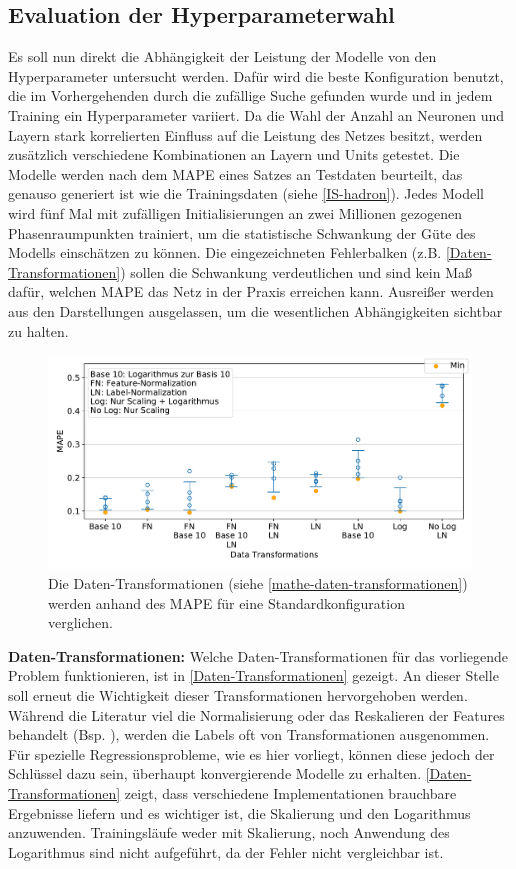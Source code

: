 \subsection{Evaluation der Hyperparameterwahl}
\label{Vergleich}
Es soll nun direkt die Abhängigkeit der Leistung der Modelle von den Hyperparameter untersucht werden. Dafür wird die beste Konfiguration benutzt, die im Vorhergehenden durch die zufällige Suche gefunden wurde und in jedem Training ein Hyperparameter variiert. Da die Wahl der Anzahl an Neuronen und Layern stark korrelierten Einfluss auf die Leistung des Netzes besitzt, werden zusätzlich verschiedene Kombinationen an Layern und Units getestet. Die Modelle werden nach dem MAPE eines Satzes an Testdaten beurteilt, das genauso generiert ist wie die Trainingsdaten (siehe \textsf{\autoref{IS-hadron}}). Jedes Modell wird fünf Mal mit zufälligen Initialisierungen an zwei Millionen gezogenen Phasenraumpunkten trainiert, um die statistische Schwankung der Güte des Modells einschätzen zu können. Die eingezeichneten Fehlerbalken (z.B. \textsf{\autoref{Daten-Transformationen}}) sollen die Schwankung verdeutlichen und sind kein Maß dafür, welchen MAPE das Netz in der Praxis erreichen kann. Ausreißer werden aus den Darstellungen ausgelassen, um die wesentlichen Abhängigkeiten sichtbar zu halten. 
\begin{figure}[b!] 
	\centering
	\includegraphics[width=14cm]{graphics/17,18}
	\caption{Die Daten-Transformationen (siehe \textsf{\autoref{mathe-daten-transformationen}}) werden anhand des MAPE für eine Standardkonfiguration verglichen.}
	\label{Daten-Transformationen}
\end{figure}

\textbf{Daten-Transformationen:}
Welche Daten-Transformationen für das vorliegende Problem funktionieren, ist in \textsf{\autoref{Daten-Transformationen}} gezeigt. An dieser Stelle soll erneut die Wichtigkeit dieser Transformationen hervorgehoben werden. Während die Literatur viel die Normalisierung oder das Reskalieren der Features behandelt (Bsp. \cite{FN, feature-scaling}), werden die Labels oft von Transformationen ausgenommen. Für spezielle Regressionsprobleme, wie es hier vorliegt, können diese jedoch der Schlüssel dazu sein, überhaupt konvergierende Modelle zu erhalten. \textsf{\autoref{Daten-Transformationen}} zeigt, dass verschiedene Implementationen brauchbare Ergebnisse liefern und es wichtiger ist, die Skalierung und den Logarithmus anzuwenden. Trainingsläufe weder mit Skalierung, noch Anwendung des Logarithmus sind nicht aufgeführt, da der Fehler nicht vergleichbar ist.

